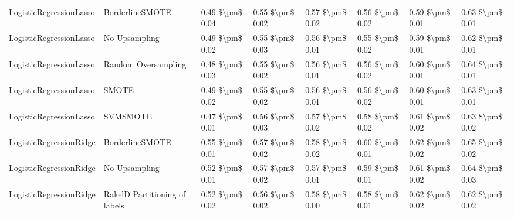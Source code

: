 \begin{tabular}{llllllll}
        LogisticRegressionLasso &               BorderlineSMOTE &     0.49 \$\textbackslash pm\$ 0.04 &           0.55 \$\textbackslash pm\$ 0.02 &       0.57 \$\textbackslash pm\$ 0.02 &        0.56 \$\textbackslash pm\$ 0.02 &                         0.59 \$\textbackslash pm\$ 0.01 &     0.63 \$\textbackslash pm\$ 0.01 \\
        LogisticRegressionLasso &                 No Upsampling &     0.49 \$\textbackslash pm\$ 0.02 &           0.55 \$\textbackslash pm\$ 0.03 &       0.56 \$\textbackslash pm\$ 0.01 &        0.55 \$\textbackslash pm\$ 0.02 &                         0.59 \$\textbackslash pm\$ 0.01 &     0.62 \$\textbackslash pm\$ 0.01 \\
        LogisticRegressionLasso &           Random Oversampling &     0.48 \$\textbackslash pm\$ 0.03 &           0.55 \$\textbackslash pm\$ 0.02 &       0.56 \$\textbackslash pm\$ 0.01 &        0.56 \$\textbackslash pm\$ 0.02 &                         0.60 \$\textbackslash pm\$ 0.01 &     0.64 \$\textbackslash pm\$ 0.01 \\
        LogisticRegressionLasso &                         SMOTE &     0.49 \$\textbackslash pm\$ 0.02 &           0.55 \$\textbackslash pm\$ 0.02 &       0.56 \$\textbackslash pm\$ 0.01 &        0.56 \$\textbackslash pm\$ 0.02 &                         0.60 \$\textbackslash pm\$ 0.01 &     0.63 \$\textbackslash pm\$ 0.01 \\
        LogisticRegressionLasso &                      SVMSMOTE &     0.47 \$\textbackslash pm\$ 0.01 &           0.56 \$\textbackslash pm\$ 0.03 &       0.57 \$\textbackslash pm\$ 0.02 &        0.58 \$\textbackslash pm\$ 0.02 &                         0.61 \$\textbackslash pm\$ 0.02 &     0.63 \$\textbackslash pm\$ 0.02 \\
        LogisticRegressionRidge &               BorderlineSMOTE &     0.55 \$\textbackslash pm\$ 0.01 &           0.57 \$\textbackslash pm\$ 0.02 &       0.58 \$\textbackslash pm\$ 0.02 &        0.60 \$\textbackslash pm\$ 0.01 &                         0.62 \$\textbackslash pm\$ 0.02 &     0.65 \$\textbackslash pm\$ 0.02 \\
        LogisticRegressionRidge &                 No Upsampling &     0.52 \$\textbackslash pm\$ 0.01 &           0.57 \$\textbackslash pm\$ 0.02 &       0.57 \$\textbackslash pm\$ 0.01 &        0.59 \$\textbackslash pm\$ 0.01 &                         0.61 \$\textbackslash pm\$ 0.02 &     0.64 \$\textbackslash pm\$ 0.03 \\
        LogisticRegressionRidge & RakelD Partitioning of labels &     0.52 \$\textbackslash pm\$ 0.02 &           0.56 \$\textbackslash pm\$ 0.02 &       0.58 \$\textbackslash pm\$ 0.00 &        0.58 \$\textbackslash pm\$ 0.01 &                         0.62 \$\textbackslash pm\$ 0.02 &     0.62 \$\textbackslash pm\$ 0.02 \\

\end{tabular}
